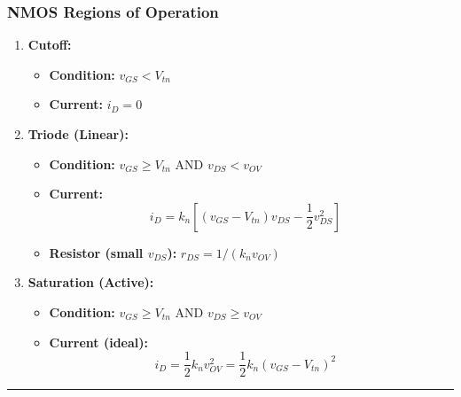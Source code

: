 \documentclass[10pt]{article}
\begin{document}
\begin{multicols}{2}
\subsubsection*{NMOS Regions of Operation}
\begin{enumerate}
    \item \textbf{Cutoff:}
    \begin{itemize}
        \item \textbf{Condition:} \( v_{GS} < V_{tn} \)
        \item \textbf{Current:} \( i_D = 0 \)
    \end{itemize}
    \item \textbf{Triode (Linear):}
    \begin{itemize}
        \item \textbf{Condition:} \( v_{GS} \ge V_{tn} \) AND \( v_{DS} < v_{OV} \)
        \item \textbf{Current:} \[ i_D = k_n \left[ (v_{GS} - V_{tn}) v_{DS} - \frac{1}{2} v_{DS}^2 \right] \quad \text{} \]
        \item \textbf{Resistor (small $v_{DS}$):} \( r_{DS} = 1 / (k_n v_{OV}) \)
    \end{itemize}
    \item \textbf{Saturation (Active):}
    \begin{itemize}
        \item \textbf{Condition:} \( v_{GS} \ge V_{tn} \) AND \( v_{DS} \ge v_{OV} \)
        \item \textbf{Current (ideal):} \[ i_D = \frac{1}{2} k_n v_{OV}^2 = \frac{1}{2} k_n (v_{GS} - V_{tn})^2 \quad \text{} \]
    \end{itemize}
\end{enumerate}

\hrule


\end{multicols}
\end{document}
